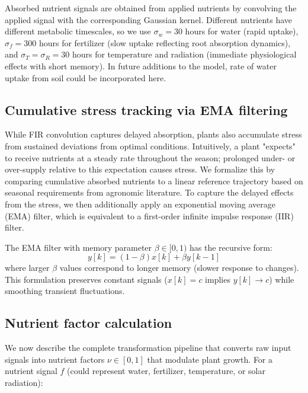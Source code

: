 \documentclass[pdflatex,sn-mathphys-num]{sn-jnl}
\begin{document}
Absorbed nutrient signals are obtained from applied nutrients by convolving the applied signal with the corresponding Gaussian kernel. Different nutrients have different metabolic timescales, so we use $\sigma_{w} = 30$ hours for water (rapid uptake), $\sigma_{f} = 300$ hours for fertilizer (slow uptake reflecting root absorption dynamics), and $\sigma_{T} = \sigma_{R} = 30$ hours for temperature and radiation (immediate physiological effects with short memory). In future additions to the model, rate of water uptake from soil could be incorporated here.

\subsection{Cumulative stress tracking via EMA filtering}\label{subsec:ema-smooth}

While FIR convolution captures delayed absorption, plants also accumulate stress from sustained deviations from optimal conditions. Intuitively, a plant "expects" to receive nutrients at a steady rate throughout the season; prolonged under- or over-supply relative to this expectation causes stress. We formalize this by comparing cumulative absorbed nutrients to a linear reference trajectory based on seasonal requirements from agronomic literature. To capture the delayed effects from the stress, we then additionally apply an exponential moving average (EMA) filter, which is equivalent to a first-order infinite impulse response (IIR) filter.  

The EMA filter with memory parameter $\beta \in [0,1)$ has the recursive form:
\begin{equation}
y[k] = (1 - \beta)x[k] + \beta y[k-1]
\label{eqn:iir-filter}
\end{equation}
where larger $\beta$ values correspond to longer memory (slower response to changes). This formulation preserves constant signals ($x[k] = c$ implies $y[k] \rightarrow c$) while smoothing transient fluctuations.

\subsection{Nutrient factor calculation}\label{subsec:nutrient-factors}

We now describe the complete transformation pipeline that converts raw input signals into nutrient factors $\nu \in [0,1]$ that modulate plant growth. For a nutrient signal $f$ (could represent water, fertilizer, temperature, or solar radiation):
\end{document}
